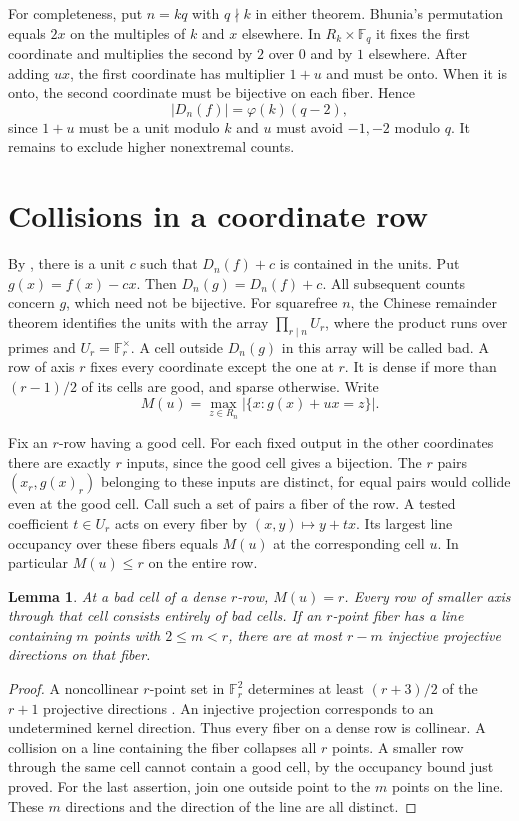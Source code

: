 \documentclass[11pt,a4paper]{article}
\newtheorem{lemma}[theorem]{Lemma}
\newcommand{\F}{\mathbb F}
\newcommand{\U}{U}
\begin{document}
For completeness, put $n=kq$ with $q\nmid k$ in either theorem. Bhunia's permutation equals $2x$ on the multiples of $k$ and $x$ elsewhere. In $R_k\times\F_q$ it fixes the first coordinate and multiplies the second by $2$ over $0$ and by $1$ elsewhere. After adding $ux$, the first coordinate has multiplier $1+u$ and must be onto. When it is onto, the second coordinate must be bijective on each fiber. Hence
\begin{equation}\label{eq:witness}
 |D_n(f)|=\varphi(k)(q-2),
\end{equation}
since $1+u$ must be a unit modulo $k$ and $u$ must avoid $-1,-2$ modulo $q$. It remains to exclude higher nonextremal counts.

\section{Collisions in a coordinate row}
By \cite[Theorem~3.1(i)]{first}, there is a unit $c$ such that $D_n(f)+c$ is contained in the units. Put $g(x)=f(x)-cx$. Then $D_n(g)=D_n(f)+c$. All subsequent counts concern $g$, which need not be bijective. For squarefree $n$, the Chinese remainder theorem identifies the units with the array $\prod_{r\mid n}\U_r$, where the product runs over primes and $\U_r=\F_r^\times$. A cell outside $D_n(g)$ in this array will be called bad. A row of axis $r$ fixes every coordinate except the one at $r$. It is dense if more than $(r-1)/2$ of its cells are good, and sparse otherwise. Write
\[
 M(u)=\max_{z\in R_n}|\{x:g(x)+ux=z\}|.
\]

Fix an $r$-row having a good cell. For each fixed output in the other coordinates there are exactly $r$ inputs, since the good cell gives a bijection. The $r$ pairs $(x_r,g(x)_r)$ belonging to these inputs are distinct, for equal pairs would collide even at the good cell. Call such a set of pairs a fiber of the row. A tested coefficient $t\in\U_r$ acts on every fiber by $(x,y)\mapsto y+tx$. Its largest line occupancy over these fibers equals $M(u)$ at the corresponding cell $u$. In particular $M(u)\le r$ on the entire row.

\begin{lemma}\label{lem:row}
At a bad cell of a dense $r$-row, $M(u)=r$. Every row of smaller axis through that cell consists entirely of bad cells. If an $r$-point fiber has a line containing $m$ points with $2\le m<r$, there are at most $r-m$ injective projective directions on that fiber.
\end{lemma}
\begin{proof}
A noncollinear $r$-point set in $\F_r^2$ determines at least $(r+3)/2$ of the $r+1$ projective directions \cite[Theorem~1]{directions}. An injective projection corresponds to an undetermined kernel direction. Thus every fiber on a dense row is collinear. A collision on a line containing the fiber collapses all $r$ points. A smaller row through the same cell cannot contain a good cell, by the occupancy bound just proved. For the last assertion, join one outside point to the $m$ points on the line. These $m$ directions and the direction of the line are all distinct.
\end{proof}
\end{document}
